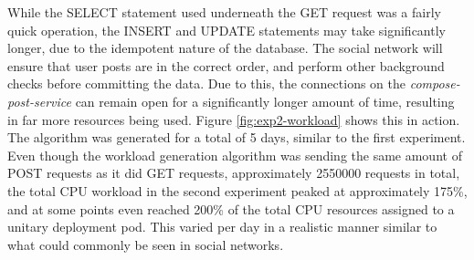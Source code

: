 \begin{center}
\begin{minipage}{\linewidth}
    \label{fig:exp2-workload}
\end{minipage}
\end{center}

While the SELECT statement used underneath the GET request was a fairly quick operation, the INSERT and UPDATE statements may take significantly longer, due to the idempotent nature of the database. The social network will ensure that user posts are in the correct order, and perform other background checks before committing the data. Due to this, the connections on the \textit{compose-post-service} can remain open for a significantly longer amount of time, resulting in far more resources being used. Figure \ref{fig:exp2-workload} shows this in action. The algorithm was generated for a total of 5 days, similar to the first experiment. Even though the workload generation algorithm was sending the same amount of POST requests as it did GET requests, approximately \num[group-separator={,}]{2550000} requests in total, the total CPU workload in the second experiment peaked at approximately 175\%, and at some points even reached 200\% of the total CPU resources assigned to a unitary deployment pod. This varied per day in a realistic manner similar to what could commonly be seen in social networks.\par

